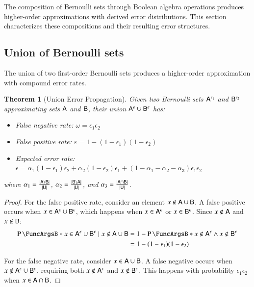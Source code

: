 \documentclass[10pt,final,hidelinks]{article}
\numberwithin{equation}{section}
\newcommand{\fprate}{\varepsilon}
\newcommand{\fnrate}{\omega}
\newcommand{\envnumstyle}{chapter}
\renewcommand{\envnumstyle}{chapter}
\renewcommand{\envnumstyle}{section}
\theoremstyle{plain}
\newtheorem{theorem}{Theorem}[\envnumstyle]
\begin{document}
The composition of Bernoulli sets through Boolean algebra operations produces higher-order approximations with derived error distributions. This section characterizes these compositions and their resulting error structures.

\subsection{Union of Bernoulli sets}

The union of two first-order Bernoulli sets produces a higher-order approximation with compound error rates.

\begin{theorem}[Union Error Propagation]
\label{thm:union_error}
Given two Bernoulli sets $\ASetFO{A}[\epsilon_1]$ and $\ASetFO{B}[\epsilon_2]$ approximating sets $\Set{A}$ and $\Set{B}$, their union $\ASetFO{A} \cup \ASetFO{B}$ has:
\begin{itemize}
\item False negative rate: $\fnrate = \epsilon_1 \epsilon_2$
\item False positive rate: $\fprate = 1 - (1-\epsilon_1)(1-\epsilon_2)$
\item Expected error rate: $\epsilon = \alpha_1(1-\epsilon_1)\epsilon_2 + \alpha_2(1-\epsilon_2)\epsilon_1 + (1-\alpha_1-\alpha_2-\alpha_3)\epsilon_1\epsilon_2$
\end{itemize}
where $\alpha_1 = \frac{|\Set{A} \setminus \Set{B}|}{|\Set{U}|}$, $\alpha_2 = \frac{|\Set{B} \setminus \Set{A}|}{|\Set{U}|}$, and $\alpha_3 = \frac{|\Set{A} \cap \Set{B}|}{|\Set{U}|}$.
\end{theorem}

\begin{proof}
For the false positive rate, consider an element $x \notin \Set{A} \cup \Set{B}$. A false positive occurs when $x \in \ASetFO{A} \cup \ASetFO{B}$, which happens when $x \in \ASetFO{A}$ or $x \in \ASetFO{B}$. Since $x \notin \Set{A}$ and $x \notin \Set{B}$:
\begin{align}
\Prob{x \in \ASetFO{A} \cup \ASetFO{B} \mid x \notin \Set{A} \cup \Set{B}} &= 1 - \Prob{x \notin \ASetFO{A} \land x \notin \ASetFO{B}}\\
&= 1 - (1-\epsilon_1)(1-\epsilon_2)
\end{align}

For the false negative rate, consider $x \in \Set{A} \cup \Set{B}$. A false negative occurs when $x \notin \ASetFO{A} \cup \ASetFO{B}$, requiring both $x \notin \ASetFO{A}$ and $x \notin \ASetFO{B}$. This happens with probability $\epsilon_1 \epsilon_2$ when $x \in \Set{A} \cap \Set{B}$.
\end{proof}
\end{document}
